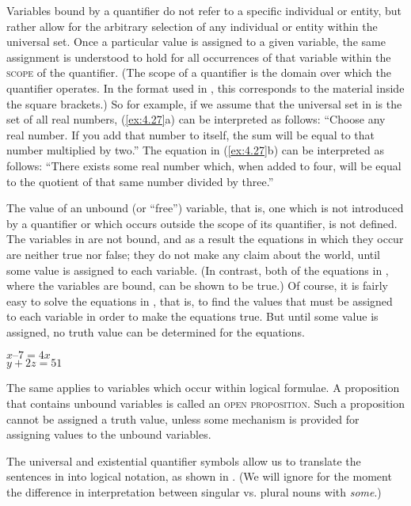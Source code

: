 Variables bound by a quantifier do not refer to a specific individual or entity, but rather allow for the arbitrary selection of any individual or entity within the universal set. Once a particular value is assigned to a given variable, the same assignment is understood to hold for all occurrences of that variable within the \textsc{scope} of the quantifier. (The scope of a quantifier is the domain over which the quantifier operates. In the format used in , this corresponds to the material inside the square brackets.) So for example, if we assume that the universal set in  is the set of all real numbers, (\ref{ex:4.27}a) can be interpreted as follows: “Choose any real number. If you add that number to itself, the sum will be equal to that number multiplied by two.” The equation in (\ref{ex:4.27}b) can be interpreted as follows: “There exists some real number which, when added to four, will be equal to the quotient of that same number divided by three.”



The value of an unbound (or “free”) variable, that is, one which is not introduced by a quantifier or which occurs outside the scope of its quantifier, is not defined. The variables in  are not bound, and as a result the equations in which they occur are neither true nor false; they do not make any claim about the world, until some value is assigned to each variable. (In contrast, both of the equations in , where the variables are bound, can be shown to be true.) Of course, it is fairly easy to solve the equations in , that is, to find the values that must be assigned to each variable in order to make the equations true. But until some value is assigned, no truth value can be determined for the equations.


\ea \label{ex:4.28}
\ea  $x–7 = 4x$\\
\ex  $y+2z = 51$
                       \z
\z


The same applies to variables which occur within logical formulae. A proposition that contains unbound variables is called an \textsc{open proposition}. Such a proposition cannot be assigned a truth value, unless some mechanism is provided for assigning values to the unbound variables.



The universal and existential quantifier symbols allow us to translate the sentences in  into logical notation, as shown in . (We will ignore for the moment the difference in interpretation between singular vs. plural nouns with \textit{some}.)


